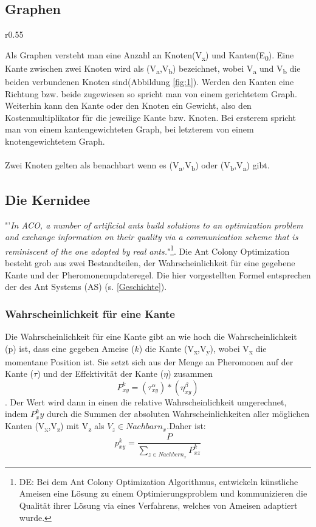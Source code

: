 \documentclass[12pt]{article}
\begin{document}
\subsection{Graphen}
\begin{wrapfigure}{r}{0.55\textwidth}
\centering
{}
\caption{Einfacher Graph}
\label{fig:1}
\end{wrapfigure}
Als Graphen versteht man eine Anzahl an Knoten(V\textsubscript{x}) und Kanten(E\textsubscript{0}). Eine Kante zwischen zwei Knoten wird als (V\textsubscript{a},V\textsubscript{b}) bezeichnet, wobei V\textsubscript{a} und V\textsubscript{b} die beiden verbundenen Knoten sind(Abbildung \ref{fig:1}). Werden den Kanten eine Richtung bzw. beide zugewiesen so spricht man von einem gerichtetem Graph. Weiterhin kann den Kante oder den Knoten ein Gewicht, also den Kostenmultiplikator für die jeweilige Kante bzw. Knoten. Bei ersterem spricht man von einem kantengewichteten Graph, bei letzterem von einem knotengewichtetem Graph.\\\\
Zwei Knoten gelten als benachbart wenn es (V\textsubscript{a},V\textsubscript{b}) oder (V\textsubscript{b},V\textsubscript{a}) gibt.
\subsection{Die Kernidee}\label{Kernidee}
"'\textit{In ACO, a number of artificial ants build solutions to an optimization problem and exchange information on their quality via a communication scheme that is reminiscent of the one adopted by real ants.}"\cite{ dorigo2007ant}\footnote{DE: Bei dem Ant Colony Optimization Algorithmus, entwickeln künstliche Ameisen eine Lösung zu einem Optimierungsproblem und kommunizieren die Qualität ihrer Lösung via eines Verfahrens, welches von Ameisen adaptiert wurde.  }. 
Die Ant Colony Optimization besteht grob aus zwei Bestandteilen, der Wahrscheinlichkeit für eine gegebene Kante und der Pheromonenupdateregel. Die hier vorgestellten Formel entsprechen der des Ant Systems (AS) (s. \ref{Geschichte}).
\subsubsection{Wahrscheinlichkeit für eine Kante}\label{P/p}
Die Wahrscheinlichkeit für eine Kante gibt an wie hoch die Wahrscheinlichkeit (p) ist, dass eine gegeben Ameise ($k$) die Kante (V\textsubscript{x},V\textsubscript{y}), wobei V\textsubscript{x} die momentane Position ist. Sie setzt sich aus der Menge an Pheromonen auf der Kante ($\tau$) und der Effektivität der Kante ($\eta$) zusammen \[ P ^{ k }_{ xy }=\left(  \tau ^{ \alpha }_{ xy } \right)*\left(  \eta ^{ \beta }_{ xy } \right)\]. 
Der Wert wird dann in einen die relative Wahrscheinlichkeit umgerechnet, indem $P^k_xy$ durch die Summen der absoluten Wahrscheinlichkeiten aller möglichen Kanten (V\textsubscript{x},V\textsubscript{z}) mit V\textsubscript{z} als $V_z \in Nachbarn_{x}$.Daher ist: \[p^{k}_{xy}=\frac{P}{\sum_{z\in Nachbern_x}{}P^{k }_{xz}} \]
\end{document}
